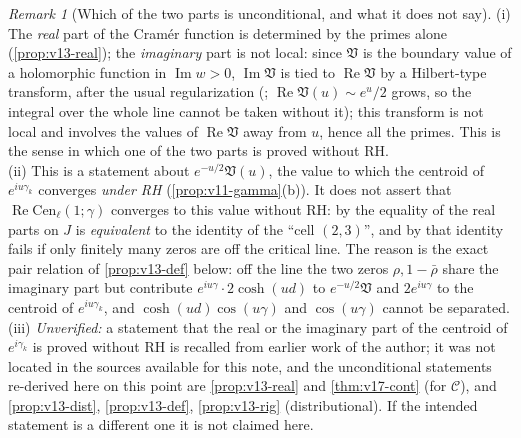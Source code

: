 \documentclass[11pt,a4paper]{article}
\numberwithin{equation}{section}
\theoremstyle{definition}
\theoremstyle{remark}
\newtheorem{remark}[theorem]{Remark}
\begin{document}
\begin{remark}[Which of the two parts is unconditional, and what it does not say]\label{rem:v13-which}
(i) The \emph{real} part of the Cram\'er function is determined by the primes alone (\cref{prop:v13-real}); the \emph{imaginary} part is not local: since $\mathfrak V$ is the boundary value of a holomorphic function in $\operatorname{Im}w>0$, $\operatorname{Im}\mathfrak V$ is tied to $\operatorname{Re}\mathfrak V$ by a Hilbert-type transform, after the usual regularization (\cite[Rem.~5.9]{CasanaV26}; $\operatorname{Re}\mathfrak V(u)\sim e^u/2$ grows, so the integral over the whole line cannot be taken without it); this transform is not local and involves the values of $\operatorname{Re}\mathfrak V$ away from $u$, hence all the primes. This is the sense in which one of the two parts is proved without RH.\\
(ii) This is a statement about $e^{-u/2}\mathfrak V(u)$, the value to which the centroid of $e^{iu\gamma_k}$ converges \emph{under RH} (\cref{prop:v11-gamma}(b)). It does not assert that $\operatorname{Re}\mathrm{Cen}_\ell(1;\gamma)$ converges to this value without RH: by \cite[Cor.~5.8]{CasanaV26} the equality of the real parts on $J$ is \emph{equivalent} to the identity of the ``cell $(2,3)$'', and by \cite[Prop.~5.10]{CasanaV26} that identity fails if only finitely many zeros are off the critical line. The reason is the exact pair relation of \cref{prop:v13-def} below: off the line the two zeros $\rho,1-\bar\rho$ share the imaginary part but contribute $e^{iu\gamma}\cdot2\cosh(ud)$ to $e^{-u/2}\mathfrak V$ and $2e^{iu\gamma}$ to the centroid of $e^{iu\gamma_k}$, and $\cosh(ud)\cos(u\gamma)$ and $\cos(u\gamma)$ cannot be separated.\\
(iii) \emph{Unverified:} a statement that the real or the imaginary part of the centroid of $e^{i\gamma_k}$ is proved without RH is recalled from earlier work of the author; it was not located in the sources available for this note, and the unconditional statements re-derived here on this point are \cref{prop:v13-real} and \cref{thm:v17-cont} (for $\mathscr C$), and \cref{prop:v13-dist}, \cref{prop:v13-def}, \cref{prop:v13-rig} (distributional). If the intended statement is a different one it is not claimed here.
\end{remark}
\end{document}
